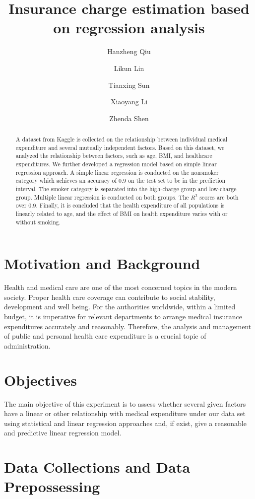 \documentclass[12pt,a4paper]{article}
\title{Insurance charge estimation based on regression analysis}
\author[2]{Hanzheng Qiu}
\author[2]{Likun Lin}
\author[2]{Tianxing Sun}
\author[1]{Xiaoyang Li}
\author[2]{Zhenda Shen}
\affil[1]{Department of Computer Science, City University of Hong Kong}
\affil[2]{Department of Mathematics, City University of Hong Kong}
\begin{document}
\maketitle


\begin{abstract}
A dataset from Kaggle is collected on the relationship between individual medical expenditure and several mutually independent factors. Based on this dataset, we analyzed the relationship between factors, such as age, BMI, and healthcare expenditures. We further developed a regression model based on simple linear regression approach. A simple linear regression is conducted on the nonsmoker category which achieves an accuracy of 0.9 on the test set to be in the prediction interval. The smoker category is separated into the high-charge group and low-charge group. Multiple linear regression is conducted on both groups. The $R^{2}$ scores are both over 0.9. Finally, it is concluded that the health expenditure of all populations is linearly related to age, and the effect of BMI on health expenditure varies with or without smoking.


\end{abstract}

\section{Motivation and Background}
Health and medical care are one of the most concerned topics in the modern society. Proper health care coverage can contribute to social stability, development and well being. For the authorities worldwide, within a limited budget, it is imperative for relevant departments to arrange medical insurance expenditures accurately and reasonably. Therefore, the analysis and management of public and personal health care expenditure is a crucial topic of administration. 

\section{Objectives}
The main objective of this experiment is to assess whether several given factors have a linear or other relationship with medical expenditure under our data set using statistical and linear regression approaches and, if exist, give a reasonable and predictive linear regression model.

\section{Data Collections and Data Prepossessing}
\end{document}
